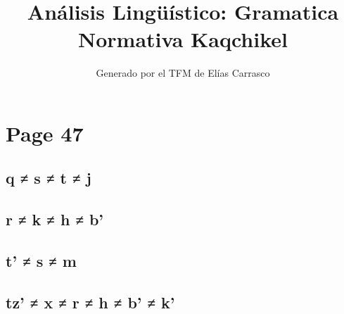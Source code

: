 \documentclass{article}%
\title{Análisis Lingüístico: Gramatica Normativa Kaqchikel}%
\author{Generado por el TFM de Elías Carrasco}%
\begin{document}
%
\normalsize%
\maketitle%
\section{Page 47}%
\label{sec:Page47}%
\subsection{q ≠ s ≠ t ≠ j}%
\label{subsec:qstj}%

%
\subsection{r ≠ k ≠ h ≠ b’}%
\label{subsec:rkhb}%

%
\subsection{t’ ≠ s ≠ m}%
\label{subsec:tsm}%

%
\subsection{tz’ ≠ x ≠ r ≠ h ≠ b’ ≠ k’}%
\label{subsec:tzxrhbk}%

%
\end{document}
